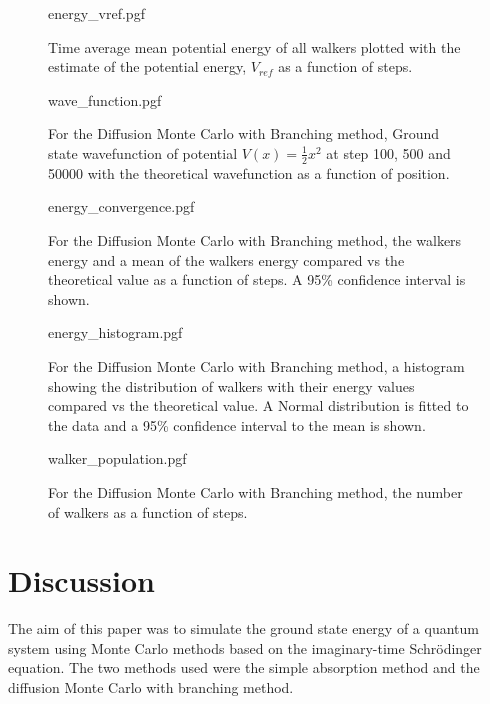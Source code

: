 \documentclass[reqno]{amsart}
\numberwithin{equation}{section}
\numberwithin{figure}{section}
\begin{document}
\begin{figure}[h]
    \centering
    {energy_vref.pgf}
    \caption{Time average mean potential energy of all walkers plotted with the estimate of the potential energy, $V_{ref}$ as a function of steps.}
    \label{fig:energy_vref}
\end{figure}

\begin{figure}[h]
    \centering
    {wave_function.pgf}
    \caption{For the Diffusion Monte Carlo with Branching method, Ground state wavefunction of potential $V(x) = \frac{1}{2}x^2$ at step 100, 500 and 50000 with the theoretical wavefunction as a function of position.}
    \label{fig:energy_vs_time}
\end{figure}

\begin{figure}[h]
    \centering
    {energy_convergence.pgf}
    \caption{For the Diffusion Monte Carlo with Branching method, the walkers energy and a mean of the walkers energy compared vs the theoretical value as a function of steps. A 95\% confidence interval is shown.}
    \label{fig:energy_convergence}
\end{figure}

\begin{figure}[h]
    \centering
    {energy_histogram.pgf}
    \caption{For the Diffusion Monte Carlo with Branching method, a histogram showing the distribution of walkers with their energy values compared vs the theoretical value. A Normal distribution is fitted to the data and a 95\% confidence interval to the mean is shown.}
    \label{fig:energy_histogram}
\end{figure}

\begin{figure}[h]
    \centering
    {walker_population.pgf}
    \caption{For the Diffusion Monte Carlo with Branching method, the number of walkers as a function of steps.}
    \label{fig:walker_population}
\end{figure}

\section{Discussion}

The aim of this paper was to simulate the ground state energy of a quantum system using Monte Carlo methods based on the imaginary-time Schrödinger equation. The two methods used were the simple absorption method and the diffusion Monte Carlo with branching method. \\
\end{document}
